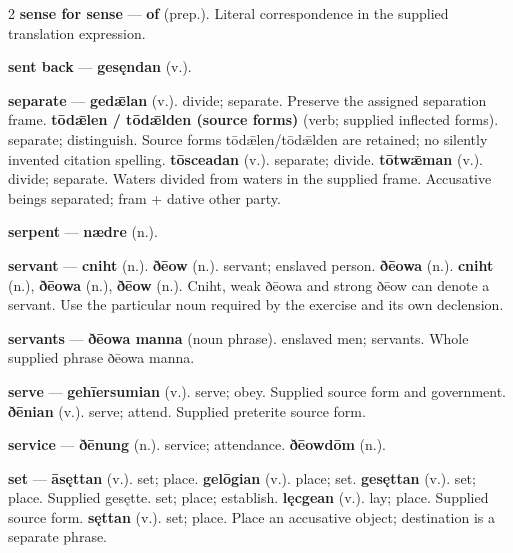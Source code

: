 \begin{multicols}{2}
\textbf{sense for sense} — \textbf{of} (prep.). Literal correspondence in the supplied translation expression.\par
\textbf{sent back} — \textbf{gesęndan} (v.).\par
\textbf{separate} — \textbf{gedǣlan} (v.). divide; separate. Preserve the assigned separation frame. \textbf{tōdǣlen / tōdǣlden (source forms)} (verb; supplied inflected forms). separate; distinguish. Source forms tōdǣlen/tōdǣlden are retained; no silently invented citation spelling. \textbf{tōsceadan} (v.). separate; divide. \textbf{tōtwǣman} (v.). divide; separate. Waters divided from waters in the supplied frame. Accusative beings separated; fram + dative other party.\par
\textbf{serpent} — \textbf{nædre} (n.).\par
\textbf{servant} — \textbf{cniht} (n.).  \textbf{ðēow} (n.). servant; enslaved person. \textbf{ðēowa} (n.).  \textbf{cniht} (n.), \textbf{ðēowa} (n.), \textbf{ðēow} (n.). Cniht, weak ðēowa and strong ðēow can denote a servant. Use the particular noun required by the exercise and its own declension.\par
\textbf{servants} — \textbf{ðēowa manna} (noun phrase). enslaved men; servants. Whole supplied phrase ðēowa manna.\par
\textbf{serve} — \textbf{gehīersumian} (v.). serve; obey. Supplied source form and government. \textbf{ðēnian} (v.). serve; attend. Supplied preterite source form.\par
\textbf{service} — \textbf{ðēnung} (n.). service; attendance. \textbf{ðēowdōm} (n.).\par
\textbf{set} — \textbf{āsęttan} (v.). set; place. \textbf{gelōgian} (v.). place; set. \textbf{gesęttan} (v.). set; place. Supplied gesętte. set; place; establish. \textbf{lęcgean} (v.). lay; place. Supplied source form. \textbf{sęttan} (v.). set; place. Place an accusative object; destination is a separate phrase.\par

\end{multicols}
